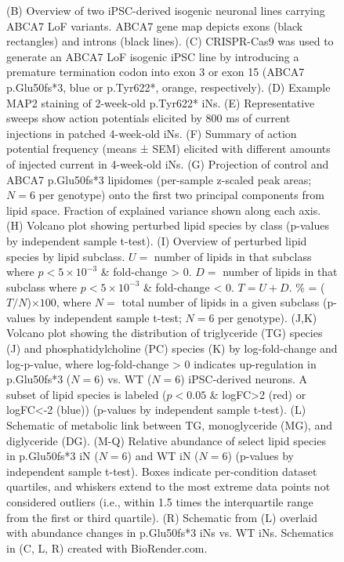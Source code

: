 \begin{figure}[ht]
{        (B) Overview of two iPSC-derived isogenic neuronal lines carrying ABCA7 LoF variants. ABCA7 gene map depicts exons (black rectangles) and introns (black lines). 
        (C) CRISPR-Cas9 was used to generate an ABCA7 LoF isogenic iPSC line by introducing a premature termination codon into exon 3 or exon 15 (ABCA7 p.Glu50fs*3, blue or p.Tyr622*, orange, respectively). 
        (D) Example MAP2 staining of 2-week-old p.Tyr622* iNs. 
        (E) Representative sweeps show action potentials elicited by 800 ms of current injections in patched 4-week-old iNs. 
        (F) Summary of action potential frequency (means ± SEM) elicited with different amounts of injected current in 4-week-old iNs. 
        (G) Projection of control and ABCA7 p.Glu50fs*3 lipidomes (per-sample z-scaled peak areas; $N=6$ per genotype) onto the first two principal components from lipid space. Fraction of explained variance shown along each axis. 
        (H) Volcano plot showing perturbed lipid species by class (p-values by independent sample t-test). 
        (I) Overview of perturbed lipid species by lipid subclass. $U =$ number of lipids in that subclass where $p<5 \times 10^{-3}$ \& fold-change > 0. $D =$ number of lipids in that subclass where $p<5 \times 10^{-3}$ \& fold-change < 0. $T = U + D$. \% = ($T/N$)$\times 100$, where $N =$ total number of lipids in a given subclass (p-values by independent sample t-test; $N=6$ per genotype). (J,K) Volcano plot showing the distribution of triglyceride (TG) species 
        (J) and phosphatidylcholine (PC) species (K) by log-fold-change and log-p-value, where log-fold-change > 0 indicates up-regulation in p.Glu50fs*3 ($N=6$) vs. WT ($N=6$) iPSC-derived neurons. A subset of lipid species is labeled ($p<0.05$ \& logFC>2 (red) or logFC<-2 (blue)) (p-values by independent sample t-test). 
        (L) Schematic of metabolic link between TG, monoglyceride (MG), and diglyceride (DG). 
        (M-Q) Relative abundance of select lipid species in p.Glu50fs*3 iN ($N=6$) and WT iN ($N=6$) (p-values by independent sample t-test). Boxes indicate per-condition dataset quartiles, and whiskers extend to the most extreme data points not considered outliers (i.e., within 1.5 times the interquartile range from the first or third quartile). (R) Schematic from (L) overlaid with abundance changes in p.Glu50fs*3 iNs vs. WT iNs. Schematics in (C, L, R) created with BioRender.com.
    }
    \label{fig:main_lipids}
\end{figure}